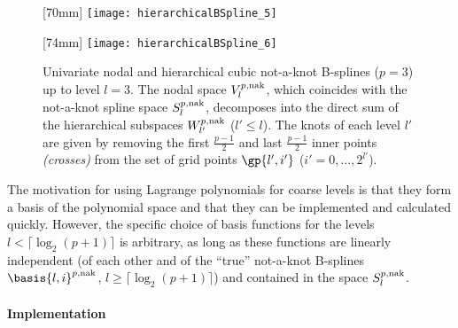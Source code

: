 \begin{figure}
  [70mm]{%
    \texttt{[image: hierarchicalBSpline\_5]}%
  }%
  \hfill%
  \hfill%
  [74mm]{%
    \texttt{[image: hierarchicalBSpline\_6]}%
  }%
  \caption{%
    Univariate nodal and hierarchical cubic not-a-knot B-splines ($p = 3$)
    up to level $l = 3$.
    The nodal space $V_l^{p,\mathrm{nak}}$,
    which coincides with the not-a-knot spline space $S_l^{p,\mathrm{nak}}$,
    decomposes into the direct sum
    of the hierarchical subspaces $W_{l'}^{p,\mathrm{nak}}$ ($l' \le l$).
    The knots of each level $l'$ are given by removing the
    first $\tfrac{p-1}{2}$ and last $\tfrac{p-1}{2}$
    inner points \emph{(crosses)}
    from the set of grid points $\gp{l',i'}$
    ($i' = 0, \dotsc, 2^{l'}$).%
  }%
  \label{fig:notAKnotBSpline}%
\end{figure}

The motivation for using Lagrange polynomials for coarse levels
is that they form a basis of the polynomial space
and that they can be implemented and calculated quickly.
However, the specific choice of basis functions for the levels
$l < \lceil\log_2(p + 1)\rceil$ is arbitrary,
as long as these functions are linearly independent
(of each other and of the ``true'' not-a-knot B-splines
$\basis{l,i}^{p,\notaknot}$, $l \ge \lceil\log_2(p+1)\rceil$)
and contained in the space $S_l^{p,\mathrm{nak}}$.

\paragraph{Implementation}

